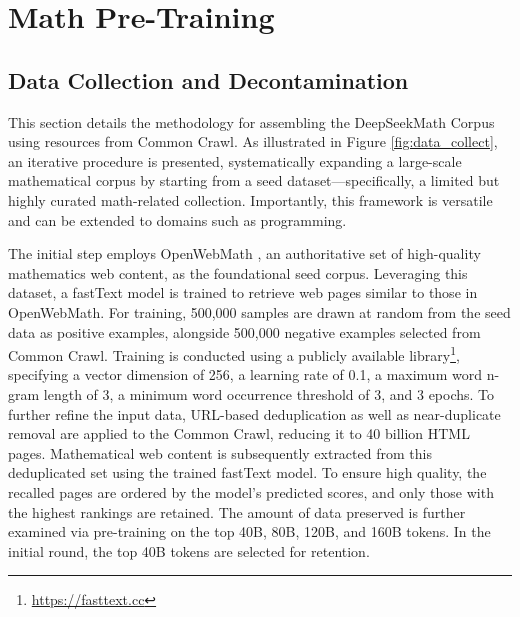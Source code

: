 \section{Math Pre-Training}

\subsection{Data Collection and Decontamination} This section details the methodology for assembling the DeepSeekMath Corpus using resources from Common Crawl. As illustrated in Figure \ref{fig:data_collect}, an iterative procedure is presented, systematically expanding a large-scale mathematical corpus by starting from a seed dataset—specifically, a limited but highly curated math-related collection. Importantly, this framework is versatile and can be extended to domains such as programming.

The initial step employs OpenWebMath \citep{openwebmath}, an authoritative set of high-quality mathematics web content, as the foundational seed corpus. Leveraging this dataset, a fastText model \citep{joulin2016fasttext} is trained to retrieve web pages similar to those in OpenWebMath. For training, 500,000 samples are drawn at random from the seed data as positive examples, alongside 500,000 negative examples selected from Common Crawl. Training is conducted using a publicly available library\footnote{\url{https://fasttext.cc}}, specifying a vector dimension of 256, a learning rate of 0.1, a maximum word n-gram length of 3, a minimum word occurrence threshold of 3, and 3 epochs. To further refine the input data, URL-based deduplication as well as near-duplicate removal are applied to the Common Crawl, reducing it to 40 billion HTML pages. Mathematical web content is subsequently extracted from this deduplicated set using the trained fastText model. To ensure high quality, the recalled pages are ordered by the model’s predicted scores, and only those with the highest rankings are retained. The amount of data preserved is further examined via pre-training on the top 40B, 80B, 120B, and 160B tokens. In the initial round, the top 40B tokens are selected for retention.

